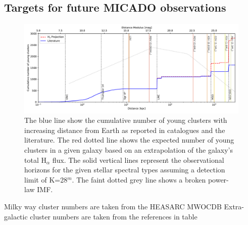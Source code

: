 \subsection{Targets for future MICADO observations}

\begin{figure}

    \centering
    \includegraphics[width=\textwidth]{images/young_clusters_within_2Mpc_incl_MW}

    \caption{The blue line show the cumulative number of young clusters with
    increasing distance from Earth as reported in catalogues and the literature.
    The red dotted line shows the expected number of young clusters in a given
    galaxy based on an extrapolation of the galaxy's total H$_\alpha$ flux. The
    solid vertical lines represent the observational horizons for the given
    stellar spectral types assuming a detection limit of K=28$^m$. The faint
    dotted grey line shows a broken power-law IMF.
    }
    \label{fig:resolved_stellar_densities}

\end{figure}

Milky way cluster numbers are taken from the HEASARC MWOCDB
Extra-galactic cluster numbers are taken from the references in table 










    
    




